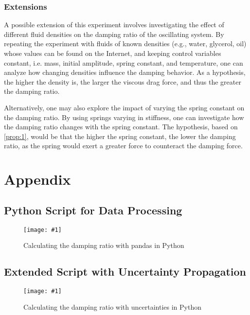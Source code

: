 \documentclass[a4paper,12pt]{article}
\newcommand{\img}[4]{\begin{center}
  \begin{figure}[H]
    \centering
    \texttt{[image: \#1]}
    \caption{#3}
    \label{fig:#4}
  \end{figure}
\end{center}}
\begin{document}
\subsubsection{Extensions}

A possible extension of this experiment involves investigating the effect of different fluid densities on the damping ratio of the oscillating system. By repeating the experiment with fluids of known densities (e.g., water, glycerol, oil) whose values can be found on the Internet, and keeping control variables constant, i.e. mass, initial amplitude, spring constant, and temperature, one can analyze how changing densities influence the damping behavior. As a hypothesis, the higher the density is, the larger the viscous drag force, and thus the greater the damping ratio.

Alternatively, one may also explore the impact of varying the spring constant on the damping ratio. By using springs varying in stiffness, one can investigate how the damping ratio changes with the spring constant. The hypothesis, based on \cref{prop:1}, would be that the higher the spring constant, the lower the damping ratio, as the spring would exert a greater force to counteract the damping force.

\pagebreak

\printbibliography[
  heading=bibintoc,
  title={Bibliography}
]

\pagebreak

\section{Appendix}

\subsection{Python Script for Data Processing}\label{app:1}
\img{figs/code/damping.png}{0.95}{Calculating the damping ratio with pandas in Python}{damping_code}

\pagebreak

\subsection{Extended Script with Uncertainty Propagation}\label{app:2}

\img{figs/code/unc.png}{0.75}{Calculating the damping ratio with uncertainties in Python}{unc_code}
\end{document}
